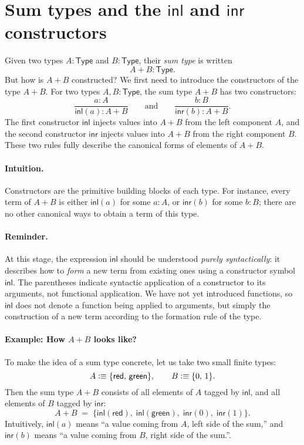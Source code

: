 \documentclass{article}
\newcommand{\Type}{\ensuremath{\mathsf{Type}}}
\newcommand{\defeq}{\vcentcolon\equiv}
\newcommand{\inl}{\mathsf{inl}}
\newcommand{\inr}{\mathsf{inr}}
\begin{document}
\section{Sum types and the \texorpdfstring{$\mathsf{inl}$}{inl} and \texorpdfstring{$\mathsf{inr}$}{inr} constructors}

Given two types \(A : \Type\) and \(B : \Type\), their \emph{sum type}
is written
\[
A + B : \Type.
\]
But how is $A + B$ constructed? We first need to introduce the constructors of the type $A+B$. For two types \(A, B : \Type\), the sum type \(A + B\) has two constructors:
\[
\frac{a : A}{\inl(a) : A + B}
\qquad\text{and}\qquad
\frac{b : B}{\inr(b) : A + B}.
\]
The first constructor \(\inl\) injects values into $A+B$ from the left component \(A\), and the second constructor \(\inr\) injects values into $A+B$ from the right component \(B\). These two rules fully describe the canonical forms of elements of \(A + B\).

\paragraph{Intuition.}
Constructors are the primitive building blocks of each type.  
For instance, every term of \(A + B\) is either \(\inl(a)\) for some \(a : A\), or \(\inr(b)\) for some \(b : B\); there are no other canonical ways to obtain a term of this type.

\paragraph{Reminder.} At this stage, the expression \(\inl\) should be understood \emph{purely syntactically}: it describes how to \emph{form} a new term from existing ones using a constructor symbol \( \inl \). The parentheses indicate syntactic application of a constructor to its arguments, not functional application. We have not yet introduced functions, so \( \inl \) does not denote a function being applied to arguments, but simply the construction of a new term according to the formation rule of the type.

\paragraph{Example: How \(A + B\) looks like?}

To make the idea of a sum type concrete, let us take two small finite types:
\[
A \defeq \{\mathsf{red},\, \mathsf{green}\}, 
\qquad
B \defeq \{0,\,1\}.
\]
Then the sum type \(A + B\) consists of all elements of \(A\) tagged by \(\inl\),
and all elements of \(B\) tagged by \(\inr\):
\[
A + B \;=\;
\{\inl(\mathsf{red}),\; \inl(\mathsf{green}),\;
  \inr(0),\; \inr(1)\}.
\]
Intuitively, \(\inl(a)\) means “a value coming from \(A\), left side of the sum,” and
\(\inr(b)\) means “a value coming from \(B\), right side of the sum.”. 
\end{document}
